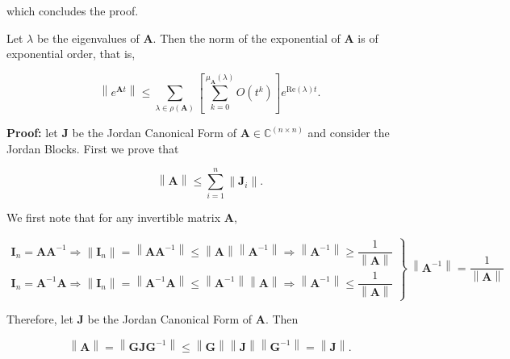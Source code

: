	which concludes the proof.

\begin{lemma}\label{lemma:exponential_matrix_norm} %
	Let $\lambda$ be the eigenvalues of $\mathbf{A}$. Then the norm of the exponential of $\mathbf{A}$ is of exponential order, that is,

\begin{equation} \left\lVert e^{\mathbf{A}t} \right\rVert \leq \sum_{\lambda\in\rho\left(\mathbf{A}\right)} \left[ \sum_{k=0}^{\mu_\mathbf{A}\left(\lambda\right)} O\left(t^k\right)\right] e^{\text{Re}\left(\lambda\right) t}. \end{equation}

\end{lemma}
\noindent\textbf{Proof: } let $\mathbf{J}$ be the Jordan Canonical Form of $\mathbf{A}\in\mathbb{C}^{(n\times n)}$ and consider the Jordan Blocks. First we prove that 

\begin{equation} \left\lVert \mathbf{A}\right\rVert \leq \sum_{i=1}^n \left\lVert \mathbf{J}_i\right\rVert . \label{eq:jordan_ji_A_ineq}\end{equation}

	We first note that for any invertible matrix $\mathbf{A}$,

\begin{equation}
\left.\begin{array}{l}
	\mathbf{I}_n = \mathbf{AA}^{-1} \Rightarrow \left\lVert \mathbf{I}_n\right\rVert =  \left\lVert \mathbf{AA}^{-1} \right\rVert \leq \left\lVert \mathbf{A}\right\rVert\left\lVert \mathbf{A}^{-1}\right\rVert \Rightarrow \left\lVert\mathbf{A}^{-1}\right\rVert \geq \dfrac{1}{\left\lVert\mathbf{A}\right\rVert} \\[7mm]
	\mathbf{I}_n = \mathbf{A}^{-1}\mathbf{A} \Rightarrow \left\lVert \mathbf{I}_n\right\rVert =  \left\lVert \mathbf{A}^{-1}\mathbf{A} \right\rVert \leq \left\lVert \mathbf{A}^{-1}\right\rVert\left\lVert \mathbf{A}\right\rVert \Rightarrow \left\lVert\mathbf{A}^{-1}\right\rVert \leq \dfrac{1}{\left\lVert\mathbf{A}\right\rVert}
\end{array}\right\}\ 
	\left\lVert\mathbf{A}^{-1}\right\rVert = \dfrac{1}{\left\lVert\mathbf{A}\right\rVert} \end{equation}

	Therefore, let $\mathbf{J}$ be the Jordan Canonical Form of $\mathbf{A}$. Then

\begin{equation} \left\lVert \mathbf{A}\right\rVert = \left\lVert \mathbf{GJG}^{-1}\right\rVert \leq \left\lVert \mathbf{G}\right\rVert\left\lVert \mathbf{J}\right\rVert\left\lVert \mathbf{G}^{-1}\right\rVert = \left\lVert \mathbf{J}\right\rVert . \label{eq:jordan_A_ineq}\end{equation}

